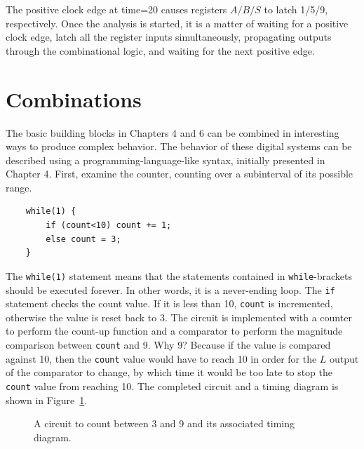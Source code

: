 The positive clock edge at time=20 causes registers $A/B/S$ to latch 1/5/9, 
respectively.  Once the analysis is started, it is a matter of waiting for a 
positive clock edge, latch all the register inputs simultaneously, propagating 
outputs through the combinational logic, and waiting for the next positive edge.
                                                                                


\section{Combinations}
The basic building blocks in Chapters 4 and 6 can be combined in interesting ways
to produce complex behavior.  The behavior of these digital systems can be described 
using a programming-language-like syntax, initially presented in Chapter 4. First, examine
the counter, counting over a subinterval of its possible range.

\begin{verbatim}
    while(1) {
        if (count<10) count += 1;
        else count = 3;
    }
\end{verbatim}

The \verb+while(1)+ statement means that the statements contained 
in \verb+while+-brackets should be executed forever.  In other 
words, it is a never-ending loop.  The \verb+if+ statement checks 
the count value. If it is less than 10, \verb+count+ is incremented, 
otherwise the value is reset back to 3. The circuit is implemented 
with a counter to perform the count-up function and a comparator 
to perform the magnitude comparison between \verb+count+ and 9.  
Why 9?  Because if the value is compared against 10, then the 
\verb+count+ value would have to reach 10 in order for the $L$ 
output of the comparator to change, by which time it would be too 
late to stop the \verb+count+ value from reaching 10.  The completed 
circuit and a timing diagram is shown in Figure~\ref{fig:comb1}.

\begin{figure}[ht]
\caption{A circuit to count between 3 and 9 and its associated timing diagram.}
\label{fig:comb1}

\end{figure}

